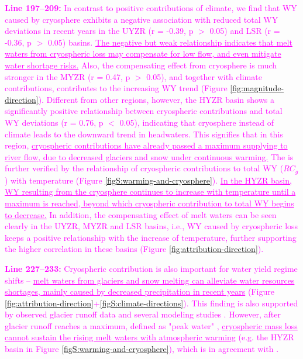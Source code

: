 \documentclass[11pt]{article}
\newcommand{\revised}[3][2]{\bigskip \textcolor{magenta}{\noindent \textbf{Line #2:} #3}}
\begin{document}
\revised{197--209}{In contrast to positive contributions of climate, we find that WY caused by cryosphere exhibits a negative association with reduced total WY deviations in recent years in the UYZR (r = -0.39, p $>$ 0.05) and LSR (r = -0.36, p $>$ 0.05) basins. 
\ul{The negative but weak relationship indicates that melt waters from cryospheric loss may compensate for low flow, and even mitigate water shortage risks.}
Also, the compensating effect from cryosphere is much stronger in the MYZR (r = 0.47, p $>$ 0.05), and together with climate contributions, contributes to the increasing WY trend (Figure \ref{fig:magnitude-direction}).
Different from other regions, however, the HYZR basin shows a significantly positive relationship between cryospheric contributions and total WY deviations (r = 0.76, p $<$ 0.05), indicating that cryosphere instead of climate leads to the downward trend in headwaters.
This signifies that in this region, \ul{cryospheric contributions have already passed a maximum supplying to river flow, due to decreased glaciers and snow under continuous warming.}
The is further verified by the relationship of cryospheric contributions to total WY ($RC_g$) with temperature (Figure \ref{figS:warming-and-cryosphere}). 
\ul{In the HYZR basin, WY resulting from the cryosphere continues to increase with temperature until a maximum is reached, beyond which cryospheric contribution to total WY begins to decrease.}
In addition, the compensating effect of melt waters can be seen clearly in the UYZR, MYZR and LSR basins, i.e., WY caused by cryospheric loss keeps a positive relationship with the increase of temperature, further supporting the higher correlation in these basins (Figure \ref{fig:attribution-direction}).}

\revised{227--233}{Cryospheric contribution is also important for water yield regime shifts -- \ul{melt waters from glaciers and snow melting can alleviate water resources shortages, mainly caused by decreased precipitation in recent years} (Figure \ref{fig:attribution-direction}+\ref{figS:climate-directions}). This finding is also supported by observed glacier runoff data \citep{yao2010glacial} and several modeling studies \citep{lutz2014consistent, Zhang2020VariationOM, wang2021tp}. 
However, after glacier runoff reaches a maximum, defined as "peak water" \citep{gleick2010peak}, \ul{cryospheric mass loss cannot sustain the rising melt waters with atmospheric warming} (e.g. the HYZR basin in Figure \ref{figS:warming-and-cryosphere}), which is in agreement with \citet{huss2018global}.}
\end{document}
